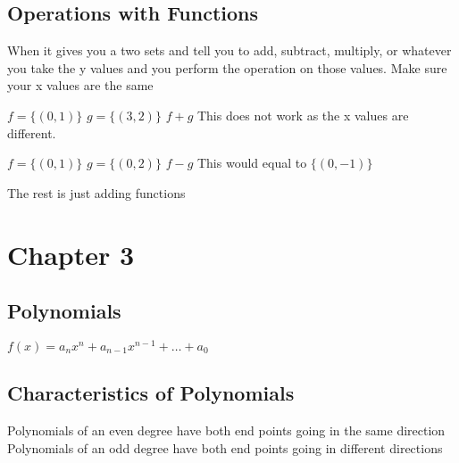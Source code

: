 \documentclass[../main.tex]{subfiles}
\begin{document}
\subsection{Operations with Functions}

When it gives you a two sets and tell you to add, subtract, multiply, or whatever you take the y values and you perform the operation on those values. Make sure your x values are the same

$f=\{(0,1)\}$ $g=\{(3,2)\}$ $f+g$ This does not work as the x values are different.

$f=\{(0,1)\}$ $g=\{(0,2)\}$ $f-g$ This would equal to $\{(0,-1)\}$

The rest is just adding functions

\section{Chapter 3}
\subsection{Polynomials}

$f(x)=a_nx^n+a_{n-1}x^{n-1}+\ldots+a_0$

\subsection{Characteristics of Polynomials}

Polynomials of an even degree have both end points going in the same direction
Polynomials of an odd degree have both end points going in different directions

 
\end{document}
